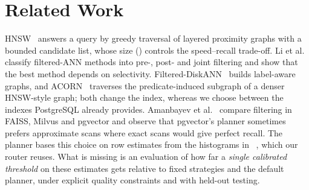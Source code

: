 \section{Related Work}
\label{sec:related}

HNSW~\cite{malkov2020hnsw} answers a query by greedy traversal of layered proximity graphs with a bounded candidate
list, whose size () controls the speed--recall trade-off. Li et al.~\cite{li2025attribute} classify
filtered-ANN methods into pre-, post- and joint filtering and show that the best method depends on selectivity.
Filtered-DiskANN~\cite{gollapudi2023filtered} builds label-aware graphs, and ACORN~\cite{patel2024acorn} traverses the
predicate-induced subgraph of a denser HNSW-style graph; both change the index, whereas we choose between the indexes
PostgreSQL already provides. Amanbayev et al.~\cite{amanbayev2026filtered} compare filtering in FAISS, Milvus and
pgvector and observe that pgvector's planner sometimes prefers approximate scans where exact scans would give perfect
recall. The planner bases this choice on row estimates from the histograms in ~\cite{pgdocs-rowest},
which our router reuses. What is missing is an evaluation of how far a \emph{single calibrated threshold} on these
estimates gets relative to fixed strategies and the default planner, under explicit quality constraints and with
held-out testing.
